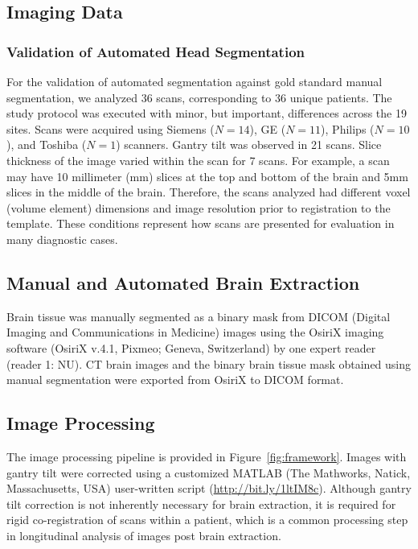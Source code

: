 \subsection{Imaging Data}
\subsubsection{Validation of Automated Head Segmentation}
For the validation of automated segmentation against gold standard manual segmentation, we analyzed 36 scans, corresponding to 36 unique patients.  The study protocol was executed with minor, but important, differences across the 19 sites.  Scans were acquired using Siemens ($N=14$), GE ($N=11$), Philips ($N=10$), and Toshiba ($N=1$) scanners. Gantry tilt was observed in 21 scans.  Slice thickness of the image varied within the scan for 7 scans. For example, a scan may have 10 millimeter (mm) slices at the top and bottom of the brain and 5mm slices in the middle of the brain.  Therefore, the scans analyzed had different voxel (volume element) dimensions and image resolution prior to registration to the template.  These conditions represent how scans are presented for evaluation in many diagnostic cases.  



\subsection{Manual and Automated Brain Extraction}
Brain tissue was manually segmented as a binary mask from DICOM (Digital Imaging and Communications in Medicine) images using the OsiriX imaging software (OsiriX v.4.1, Pixmeo; Geneva, Switzerland) by one expert reader (reader 1: NU). 
CT brain images and the binary brain tissue mask obtained using manual segmentation were exported from OsiriX to DICOM format.  

\subsection{Image Processing}
The image processing pipeline is provided in Figure~\ref{fig:framework}.
Images with gantry tilt were corrected using a customized MATLAB (The Mathworks, Natick, Massachusetts, USA) user-written script (\url{http://bit.ly/1ltIM8c}).  Although gantry tilt correction is not inherently necessary for brain extraction, it is required for rigid co-registration of scans within a patient, which is a common processing step in longitudinal analysis of images post brain extraction. 

